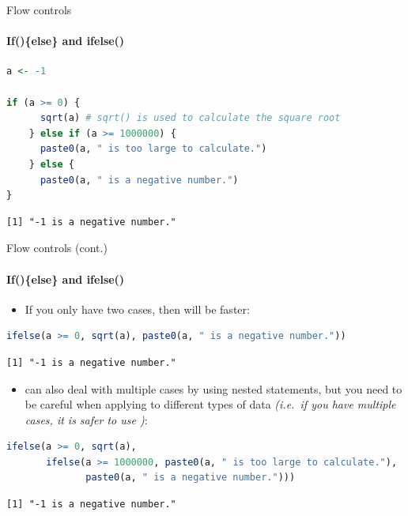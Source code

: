 \begin{frame}[fragile]{Flow controls}
\framesubtitle{If()\{else\} and ifelse()}
\begin{lstlisting}[language=R]
a <- -1

if (a >= 0) {
      sqrt(a) # sqrt() is used to calculate the square root
    } else if (a >= 1000000) {
      paste0(a, " is too large to calculate.")
    } else {
      paste0(a, " is a negative number.")
}
\end{lstlisting}
\begin{lstlisting}[style=output]
[1] "-1 is a negative number."
\end{lstlisting}
\end{frame}

\begin{frame}[fragile]{Flow controls (cont.)}
\framesubtitle{If()\{else\} and ifelse()}
\begin{itemize}
  \item If you only have two cases, then  will be faster:
\end{itemize}
\begin{lstlisting}[language=R]
ifelse(a >= 0, sqrt(a), paste0(a, " is a negative number."))
\end{lstlisting}
\begin{lstlisting}[style=output]
[1] "-1 is a negative number."
\end{lstlisting}
\begin{itemize}
  \item {} can also deal with multiple cases by using nested statements, but you need to be careful when applying to different types of data \textit{(i.e.\ if you have multiple cases, it is safer to use )}:
\end{itemize}
\begin{lstlisting}[language=R]
ifelse(a >= 0, sqrt(a),
       ifelse(a >= 1000000, paste0(a, " is too large to calculate."),
              paste0(a, " is a negative number.")))
\end{lstlisting}
\begin{lstlisting}[style=output]
[1] "-1 is a negative number."
\end{lstlisting}
\end{frame}

